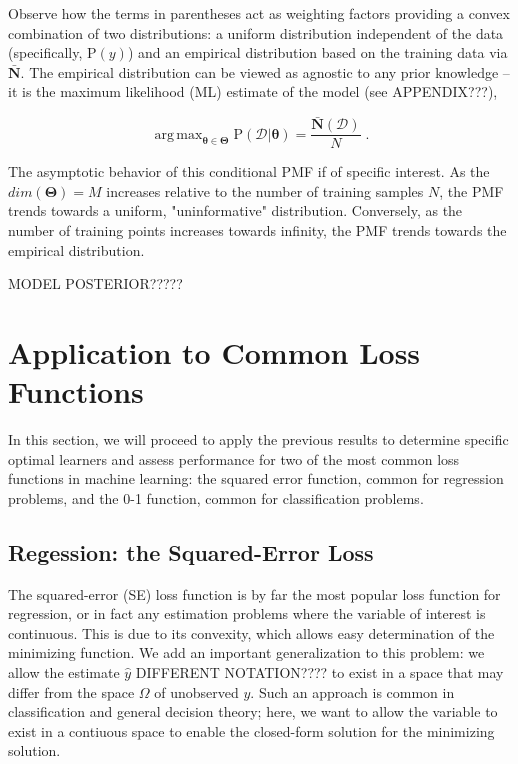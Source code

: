 \documentclass[12pt]{article}
\DeclareMathOperator*{\argmax}{arg\,max}
\begin{document}
Observe how the terms in parentheses act as weighting factors providing a convex combination of two distributions: a uniform distribution independent of the data (specifically, $\text{P}(y)$) and an empirical distribution based on the training data via $\bar{\bm{N}}$. The empirical distribution can be viewed as agnostic to any prior knowledge -- it is the maximum likelihood (ML) estimate of the model (see APPENDIX???),

\begin{equation}
\argmax_{\bm{\theta} \in \bm{\Theta}} \text{P}(\mathcal{D} | \bm{\theta}) = \frac{\bar{\bm{N}}(\mathcal{D})}{N} \;.
\end{equation}

The asymptotic behavior of this conditional PMF if of specific interest. As the $dim(\bm{\Theta}) = M$ increases relative to the number of training samples $N$, the PMF trends towards a uniform, "uninformative" distribution. Conversely, as the number of training points increases towards infinity, the PMF trends towards the empirical distribution. 

MODEL POSTERIOR?????




\section{Application to Common Loss Functions}

In this section, we will proceed to apply the previous results to determine specific optimal learners and assess performance for two of the most common loss functions in machine learning: the squared error function, common for regression problems, and the 0-1 function, common for classification problems. 

\subsection{Regession: the Squared-Error Loss}

The squared-error (SE) loss function is by far the most popular loss function for regression, or in fact any estimation problems where the variable of interest is continuous. This is due to its convexity, which allows easy determination of the minimizing function. We add an important generalization to this problem: we allow the estimate $\hat{y}$ DIFFERENT NOTATION???? to exist in a space that may differ from the space $\Omega$ of unobserved $y$. Such an approach is common in classification and general decision theory; here, we want to allow the variable to exist in a contiuous space to enable the closed-form solution for the minimizing solution.




\end{document}
